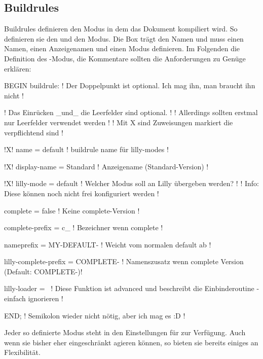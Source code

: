 \subsection{Buildrules}
Buildrules definieren den Modus in dem das Dokument kompiliert wird. So definieren sie den  und den  Modus. Die Box trägt den Namen  und muss einen Namen, einen Anzeigenamen und einen Modus definieren. Im Folgenden die Definition des -Modus, die Kommentare sollten die Anforderungen zu Genüge erklären:
{%
\begin{plaingepard}
BEGIN buildrule: ! Der Doppelpunkt ist optional. Ich mag ihn, man braucht ihn nicht !

    ! Das Einrücken _und_ die Leerfelder sind optional. !
    ! Allerdings sollten erstmal nur Leerfelder verwendet werden !
    ! Mit X sind Zuweisungen markiert die verpflichtend sind !

!X!  name                   = default     ! buildrule name für lilly-modes !

!X!  display-name           = Standard    ! Anzeigename (Standard-Version) !

!X!  lilly-mode             = default     ! Welcher Modus soll an Lilly übergeben werden? !
                                          ! Info: Diese können noch nicht frei konfiguriert werden !

     complete               = false       ! Keine complete-Version !

     complete-prefix        = c_          ! Bezeichner wenn complete !

     nameprefix             = MY-DEFAULT- ! Weicht vom normalen default ab !

     lilly-complete-prefix  = COMPLETE-   ! Namenszusatz wenn complete Version (Default: COMPLETE-)!

     lilly-loader           = \
                    ! Diese Funktion ist advanced und beschreibt die Einbinderoutine - einfach
                      ignorieren !

END; ! Semikolon wieder nicht nötig, aber ich mag es :D !
\end{plaingepard}
}
Jeder so definierte Modus steht in den Einstellungen für  zur Verfügung. Auch wenn sie bisher eher eingeschränkt agieren können, so bieten sie bereits einiges an Flexibilität.

